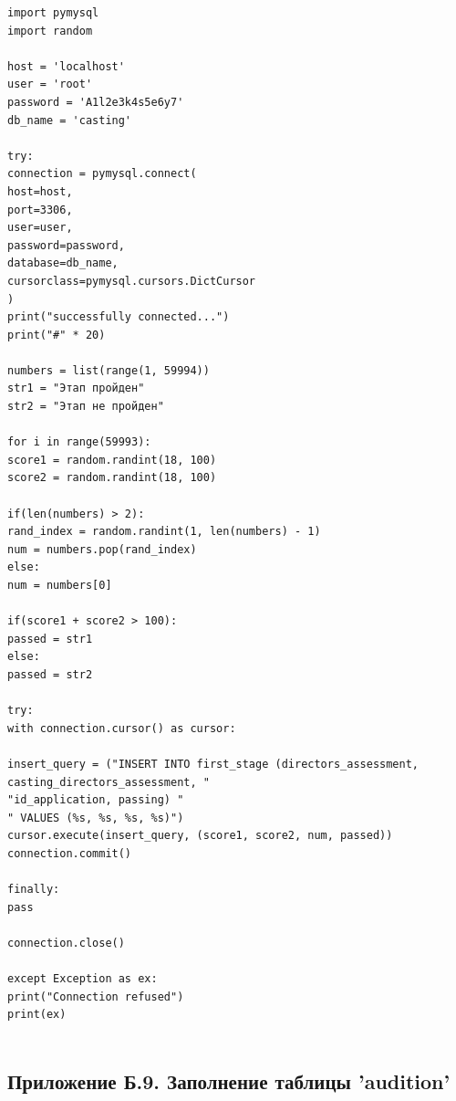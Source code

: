 \documentclass[11pt,a4paper,final]{article} %
\begin{document}
\begin{lstlisting}	
import pymysql
import random

host = 'localhost'
user = 'root'
password = 'A1l2e3k4s5e6y7'
db_name = 'casting'

try:
connection = pymysql.connect(
host=host,
port=3306,
user=user,
password=password,
database=db_name,
cursorclass=pymysql.cursors.DictCursor
)
print("successfully connected...")
print("#" * 20)

numbers = list(range(1, 59994))
str1 = "Этап пройден"
str2 = "Этап не пройден"

for i in range(59993):
score1 = random.randint(18, 100)
score2 = random.randint(18, 100)

if(len(numbers) > 2):
rand_index = random.randint(1, len(numbers) - 1)
num = numbers.pop(rand_index)
else:
num = numbers[0]

if(score1 + score2 > 100):
passed = str1
else:
passed = str2

try:
with connection.cursor() as cursor:

insert_query = ("INSERT INTO first_stage (directors_assessment, casting_directors_assessment, "
"id_application, passing) "
" VALUES (%s, %s, %s, %s)")
cursor.execute(insert_query, (score1, score2, num, passed))
connection.commit()

finally:
pass

connection.close()

except Exception as ex:
print("Connection refused")
print(ex)
	
\end{lstlisting}	


\subsection*{Приложение Б.9. Заполнение таблицы 'audition'}
\end{document}
